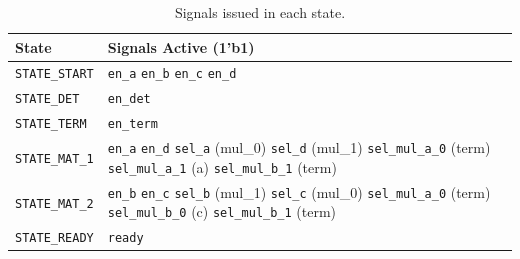 \documentclass[../main.tex]{subfiles}
\begin{document}
\begin{table}[h]
    \centering
    \renewcommand{\arraystretch}{1.5}
    \setlength{\tabcolsep}{6pt}

    \begin{tabularx}{\textwidth}{@{}l X@{}}
        \toprule
        \textbf{State} & \textbf{Signals Active (1'b1)} \\
        \midrule
        \texttt{STATE\_START} & 
            \texttt{en\_a} \newline
            \texttt{en\_b} \newline
            \texttt{en\_c} \newline
            \texttt{en\_d} \\
        \hline
        \texttt{STATE\_DET} & 
            \texttt{en\_det} \\
        \hline
        \texttt{STATE\_TERM} & 
            \texttt{en\_term} \\
        \hline
        \texttt{STATE\_MAT\_1} & 
            \texttt{en\_a} \newline
            \texttt{en\_d} \newline
            \texttt{sel\_a} (mul\_0) \newline
            \texttt{sel\_d} (mul\_1) \newline
            \texttt{sel\_mul\_a\_0} (term) \newline
            \texttt{sel\_mul\_a\_1} (a) \newline
            \texttt{sel\_mul\_b\_1} (term) \\
        \hline
        \texttt{STATE\_MAT\_2} & 
            \texttt{en\_b} \newline
            \texttt{en\_c} \newline
            \texttt{sel\_b} (mul\_1) \newline
            \texttt{sel\_c} (mul\_0) \newline
            \texttt{sel\_mul\_a\_0} (term) \newline
            \texttt{sel\_mul\_b\_0} (c) \newline
            \texttt{sel\_mul\_b\_1} (term) \\
        \hline
        \texttt{STATE\_READY} & 
            \texttt{ready} \\
        \bottomrule
    \end{tabularx}

    \caption{Signals issued in each state.}
    \label{tab:q1_state_signals}
\end{table}
\end{document}
